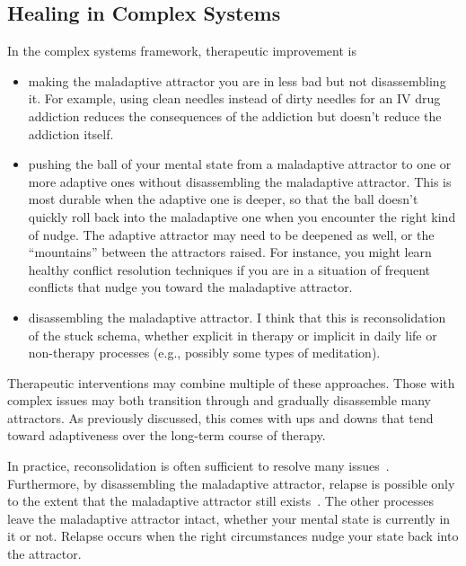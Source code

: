 \documentclass[11pt,oneside]{book}
\let\cite\parencite
\begin{document}
\subsection*{Healing in Complex Systems}
In the complex systems framework, therapeutic improvement is~\cite{hayes2020complex}
\begin{itemize}
    \item making the maladaptive attractor you are in less bad but not disassembling it. For example, using clean needles instead of dirty needles for an IV drug addiction reduces the consequences of the addiction but doesn't reduce the addiction itself.
    \item pushing the ball of your mental state from a maladaptive attractor to one or more adaptive ones without disassembling the maladaptive attractor. This is most durable when the adaptive one is deeper, so that the ball doesn't quickly roll back into the maladaptive one when you encounter the right kind of nudge. The adaptive attractor may need to be deepened as well, or the \enquote{mountains} between the attractors raised. For instance, you might learn healthy conflict resolution techniques if you are in a situation of frequent conflicts that nudge you toward the maladaptive attractor.
    \item disassembling the maladaptive attractor. I think that this is reconsolidation of the stuck schema, whether explicit in therapy or implicit in daily life or non-therapy processes (e.g., possibly some types of meditation).
\end{itemize}

Therapeutic interventions may combine multiple of these approaches. Those with complex issues may both transition through and gradually disassemble many attractors. As previously discussed, this comes with ups and downs that tend toward adaptiveness over the long-term course of therapy.

In practice, reconsolidation is often sufficient to resolve many issues~\cite{eckerUnlocking}. Furthermore, by disassembling the maladaptive attractor, relapse is possible only to the extent that the maladaptive attractor still exists~\cite{hayes2020complex}. The other processes leave the maladaptive attractor intact, whether your mental state is currently in it or not. Relapse occurs when the right circumstances nudge your state back into the attractor.
\end{document}
